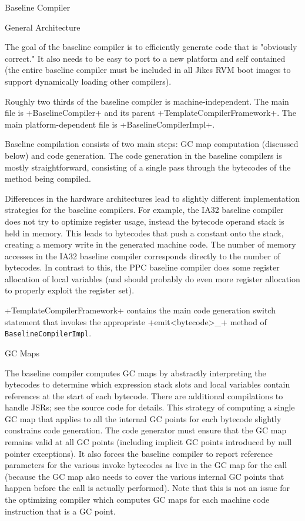 \begin{section}{Baseline Compiler}
\label{sec:baselinecompiler}

\begin{subsection}{General Architecture}

The goal of the baseline compiler is to efficiently generate code that is "obviously correct." It also needs to be easy to port to a new platform and self contained (the entire baseline compiler must be included in all Jikes RVM boot images to support dynamically loading other compilers). 

Roughly two thirds of the baseline compiler is machine-independent. The main file is \spverb+BaselineCompiler+ and its parent \spverb+TemplateCompilerFramework+. The main platform-dependent file is \spverb+BaselineCompilerImpl+.

Baseline compilation consists of two main steps: GC map computation (discussed below) and code generation. The code generation in the baseline compilers is mostly straightforward, consisting of a single pass through the bytecodes of the method being compiled.

Differences in the hardware architectures lead to slightly different implementation strategies for the baseline compilers. For example, the IA32 baseline compiler does not try to optimize register usage, instead the bytecode operand stack is held in memory. This leads to bytecodes that push a constant onto the stack, creating a memory write in the generated machine code. The number of memory accesses in the IA32 baseline compiler corresponds directly to the number of bytecodes. In contrast to this, the PPC baseline compiler does some register allocation of local variables (and should probably do even more register allocation to properly exploit the register set).

\spverb+TemplateCompilerFramework+ contains the main code generation switch statement that invokes the appropriate \spverb+emit<bytecode>_+ method of \texttt{Ba\-se\-li\-ne\-Com\-pi\-ler\-Impl}.

\end{subsection}

\begin{subsection}{GC Maps}

The baseline compiler computes GC maps by abstractly interpreting the bytecodes to determine which expression stack slots and local variables contain references at the start of each bytecode. There are additional compilations to handle JSRs; see the source code for details. This strategy of computing a single GC map that applies to all the internal GC points for each bytecode slightly constrains code generation. The code generator must ensure that the GC map remains valid at all GC points (including implicit GC points introduced by null pointer exceptions). It also forces the baseline compiler to report reference parameters for the various invoke bytecodes as live in the GC map for the call (because the GC map also needs to cover the various internal GC points that happen before the call is actually performed). Note that this is not an issue for the optimizing compiler which computes GC maps for each machine code instruction that is a GC point.


\end{subsection}
\end{section}
